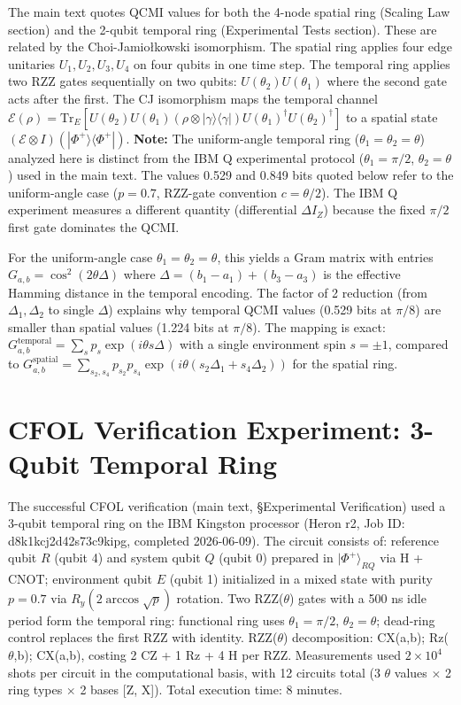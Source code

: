 \documentclass[aps,prl,superscriptaddress,nofootinbib]{revtex4-2}
\begin{document}
The main text quotes QCMI values for both the 4-node spatial ring (Scaling Law section) and the 2-qubit temporal ring (Experimental Tests section). These are related by the Choi-Jamio{\l}kowski isomorphism. The spatial ring applies four edge unitaries $U_1,U_2,U_3,U_4$ on four qubits in one time step. The temporal ring applies two RZZ gates sequentially on two qubits: $U(\theta_2)U(\theta_1)$ where the second gate acts after the first. The CJ isomorphism maps the temporal channel $\mathcal{E}(\rho) = \mathrm{Tr}_E[U(\theta_2)U(\theta_1)(\rho\otimes|\gamma\rangle\langle\gamma|)U(\theta_1)^\dagger U(\theta_2)^\dagger]$ to a spatial state $(\mathcal{E}\otimes I)(|\Phi^+\rangle\langle\Phi^+|)$. \textbf{Note:} The uniform-angle temporal ring ($\theta_1=\theta_2=\theta$) analyzed here is distinct from the IBM Q experimental protocol ($\theta_1=\pi/2$, $\theta_2=\theta$) used in the main text. The values 0.529 and 0.849 bits quoted below refer to the uniform-angle case ($p=0.7$, RZZ-gate convention $c=\theta/2$). The IBM Q experiment measures a different quantity (differential $\Delta I_Z$) because the fixed $\pi/2$ first gate dominates the QCMI.

For the uniform-angle case $\theta_1=\theta_2=\theta$, this yields a Gram matrix with entries $G_{a,b} = \cos^2(2\theta\Delta)$ where $\Delta = (b_1-a_1)+(b_3-a_3)$ is the effective Hamming distance in the temporal encoding. The factor of 2 reduction (from $\Delta_1,\Delta_2$ to single $\Delta$) explains why temporal QCMI values (0.529 bits at $\pi/8$) are smaller than spatial values (1.224 bits at $\pi/8$). The mapping is exact: $G^{\mathrm{temporal}}_{a,b} = \sum_{s} p_s \exp(i\theta s\Delta)$ with a single environment spin $s=\pm 1$, compared to $G^{\mathrm{spatial}}_{a,b} = \sum_{s_2,s_4} p_{s_2}p_{s_4} \exp(i\theta(s_2\Delta_1+s_4\Delta_2))$ for the spatial ring.


\section{CFOL Verification Experiment: 3-Qubit Temporal Ring}
\label{sec:cfolverif}

The successful CFOL verification (main text, \S Experimental Verification) used a 3-qubit temporal ring on the IBM Kingston processor (Heron r2, Job ID: d8k1kcj2d42s73c9kipg, completed 2026-06-09). The circuit consists of: reference qubit $R$ (qubit 4) and system qubit $Q$ (qubit 0) prepared in $|\Phi^+\rangle_{RQ}$ via H + CNOT; environment qubit $E$ (qubit 1) initialized in a mixed state with purity $p=0.7$ via $R_y(2\arccos\sqrt{p})$ rotation. Two RZZ($\theta$) gates with a 500 ns idle period form the temporal ring: functional ring uses $\theta_1=\pi/2$, $\theta_2=\theta$; dead-ring control replaces the first RZZ with identity. RZZ($\theta$) decomposition: CX(a,b); Rz($\theta$,b); CX(a,b), costing 2 CZ + 1 Rz + 4 H per RZZ. Measurements used $2\times10^4$ shots per circuit in the computational basis, with 12 circuits total (3 $\theta$ values $\times$ 2 ring types $\times$ 2 bases [Z, X]). Total execution time: 8 minutes.
\end{document}

